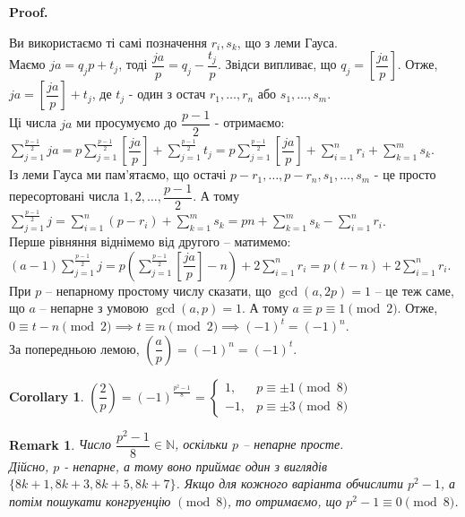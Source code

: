 \documentclass[a4paper, 14pt]{extarticle}
\makeatletter
\theoremstyle{theoremdd}
\theoremstyle{theoremdd}
\theoremstyle{theoremdd}
\theoremstyle{theoremdd}
\theoremstyle{theoremdd}
\theoremstyle{theoremdd}
\newtheorem{remark}[theorem]{Remark}
\theoremstyle{theoremdd}
\theoremstyle{theoremdd}
\newtheorem{corollary}[theorem]{Corollary}
\def\qed{$\blacksquare$}
\renewenvironment{proof}[1][Proof.\\]{\par
\pushQED{\hfill \qed}%
\normalfont \topsep6\p@\@plus6\p@\relax
\trivlist
\item\relax
{\bfseries
#1\@addpunct{.}}\hspace\labelsep\ignorespaces
}{%
\popQED\endtrivlist\@endpefalse
}
\makeatother
\begin{document}
\begin{proof}
Ви використаємо ті самі позначення $r_i,s_k$, що з леми Гауса.\\
Маємо $ja = q_j p + t_j$, тоді $\dfrac{ja}{p} = q_j - \dfrac{t_j}{p}$. Звідси випливає, що $q_j = \left[ \dfrac{ja}{p} \right]$. Отже, $ja = \left[ \dfrac{ja}{p} \right] + t_j$, де $t_j$ - один з остач $r_1,\dots,r_n$ або $s_1,\dots,s_m$.\\
Ці числа $ja$ ми просумуємо до $\dfrac{p-1}{2}$ - отримаємо:\\
$\displaystyle\sum_{j=1}^{\frac{p-1}{2}} ja = p\sum_{j=1}^{\frac{p-1}{2}} \left[ \dfrac{ja}{p} \right] + \sum_{j=1}^{\frac{p-1}{2}}t_j = p\sum_{j=1}^{\frac{p-1}{2}} \left[ \dfrac{ja}{p} \right] + \sum_{i=1}^n r_i + \sum_{k=1}^m s_k$.\\
Із леми Гауса ми пам'ятаємо, що остачі $p-r_1,\dots,p-r_n, s_1,\dots,s_m$ - це просто пересортовані числа $1,2,\dots,\dfrac{p-1}{2}$. А тому\\
$\displaystyle\sum_{j=1}^{\frac{p-1}{2}} j = \sum_{i=1}^n (p-r_i) + \sum_{k=1}^m s_k = pn + \sum_{k=1}^m s_k - \sum_{i=1}^n r_i$.\\
Перше рівняння віднімемо від другого -- матимемо:\\
$\displaystyle (a-1)\sum_{j=1}^{\frac{p-1}{2}}j = p \left( \sum_{j=1}^{\frac{p-1}{2}} \left[ \dfrac{ja}{p} \right] - n \right) + 2 \sum_{i=1}^n r_i = p(t-n)+2 \sum_{i=1}^n r_i$.\\
При $p$ -- непарному простому числу сказати, що $\gcd(a,2p) = 1$ -- це теж саме, що $a$ -- непарне з умовою $\gcd(a,p) = 1$. А тому $a \equiv p \equiv 1 \pmod 2$. Отже,\\
$0 \equiv t-n \pmod 2 \implies t \equiv n \pmod 2 \implies (-1)^t = (-1)^n$.\\
За попередньою лемою, $\left( \dfrac{a}{p} \right) = (-1)^n = (-1)^t$.
\end{proof}

\begin{corollary}
$\left( \dfrac{2}{p} \right) = (-1)^{\textstyle\frac{p^2-1}{8}} = \begin{cases} 1, & p \equiv \pm 1 \pmod 8 \\ -1, & p \equiv \pm 3 \pmod 8 \end{cases}$
\end{corollary}

\begin{remark}
Число $\dfrac{p^2-1}{8} \in \mathbb{N}$, оскільки $p$ -- непарне просте.\\ Дійсно, $p$ - непарне, а тому воно приймає один з виглядів $\{8k+1,8k+3,8k+5,8k+7\}$. Якщо для кожного варіанта обчислити $p^2-1$, а потім пошукати конгруенцію $\pmod 8$, то отримаємо, що $p^2-1 \equiv 0 \pmod 8$.
\end{remark}
\end{document}
